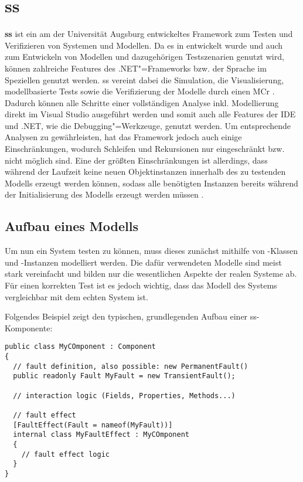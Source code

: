 \section{\acl{ss}}
\label{sec:ssharp}

\textbf{\acf{ss}} ist ein am \isse der Universität Augsburg entwickeltes Framework zum Testen und Verifizieren von Systemen und Modellen.
Da es in \cS entwickelt wurde und \cS auch zum Entwickeln von Modellen und dazugehörigen Testszenarien genutzt wird, können zahlreiche Features des .NET"=Frameworks bzw. der Sprache \cS im Speziellen genutzt werden.
\ac{ss} vereint dabei die Simulation, die Visualisierung, modellbasierte Tests sowie die Verifizierung der Modelle durch einen \ac{MCr} \cite{Habermaier2015,Habermaier2016}.
Dadurch können alle Schritte einer vollständigen Analyse inkl. Modellierung direkt im Visual Studio ausgeführt werden und somit auch alle Features der IDE und .NET, wie \zB die Debugging"=Werkzeuge, genutzt werden.
Um entsprechende Analysen zu gewährleisten, hat das Framework jedoch auch einige Einschränkungen, wodurch \zB Schleifen und Rekursionen nur eingeschränkt bzw. nicht möglich sind.
Eine der größten Einschränkungen ist allerdings, dass während der Laufzeit keine neuen Objektinstanzen innerhalb des zu testenden Modells erzeugt werden können, sodass alle benötigten Instanzen bereits während der Initialisierung des Modells erzeugt werden müssen \cite{Habermaier2015}.

\subsection{Aufbau eines Modells}
\label{subsec:ssharpModel}


Um nun ein System testen zu können, muss dieses zunächst mithilfe von \cS-Klassen und -Instanzen modelliert werden.
Die dafür verwendeten Modelle sind meist stark vereinfacht und bilden nur die wesentlichen Aspekte der realen Systeme ab.
Für einen korrekten Test ist es jedoch wichtig, dass das Modell des Systems vergleichbar mit dem echten System ist.

Folgendes Beispiel zeigt den typischen, grundlegenden Aufbau einer \ac{ss}-Komponente:

\begin{lstlisting}[label=lst:ssExample,style=cs,
caption={Grundlegender Aufbau einer \acs{ss}-Komponente.}]
public class MyCOmponent : Component
{
  // fault definition, also possible: new PermanentFault()
  public readonly Fault MyFault = new TransientFault();
  
  // interaction logic (Fields, Properties, Methods...)
  
  // fault effect
  [FaultEffect(Fault = nameof(MyFault))]
  internal class MyFaultEffect : MyCOmponent
  {
    // fault effect logic
  }
}
\end{lstlisting}

